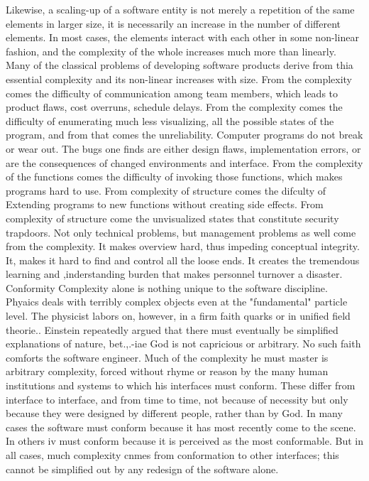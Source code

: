 \documentclass[12pt]{article}
\begin{document}
Likewise, a scaling-up of a software entity is not merely a repetition of the same
elements in larger size, it is necessarily an increase in the number of different elements.
In most cases, the elements interact with each other in some non-linear fashion, and the
complexity of the whole increases much more than linearly.
Many of the classical problems of developing software products derive from thia
essential complexity and its non-linear increases with size. From the complexity comes
the difficulty of communication among team members, which leads to product flaws, cost
overruns, schedule delays. From the complexity comes the difficulty of enumerating much
less visualizing, all the possible states of the program, and from that comes the unreliability.
Computer programs do not break or wear out. The bugs one finds are either design flaws,
implementation errors, or are the consequences of changed environments and interface.
From the complexity of the functions comes the difficulty of invoking those functions,
which makes programs hard to use. From complexity of structure comes the difculty of
Extending programs to new functions without creating side effects. From complexity of
structure come the unvisualized states that constitute security trapdoors.
Not only technical problems, but management problems as well come from the
complexity. It makes overview hard, thus impeding conceptual integrity. It, makes it hard
to find and control all the loose ends. It creates the tremendous learning and ,inderstanding
burden that makes personnel turnover a disaster.
Conformity
Complexity alone is nothing unique to the software discipline. Phyaics deals with
terribly complex objects even at the "fundamental" particle level. The physicist labors
on, however, in a firm faith %
quarks or in unified field theorie.. Einstein repeatedly argued that there must eventually
be simplified explanations of nature, bet.,.-iae God is not capricious or arbitrary.
No such faith comforts the software engineer. Much of the complexity he must master
is arbitrary complexity, forced without rhyme or reason by the many human institutions
and systems to which his interfaces must conform. These differ from interface to interface,
and from time to time, not because of necessity but only because they were designed by
different people, rather than by God.
In many cases the software must conform because it has most recently come to the
scene. In others iv must conform because it is perceived as the most conformable. But
in all cases, much complexity cnmes from conformation to other interfaces; this cannot be
simplified out by any redesign of the software alone.
\end{document}
